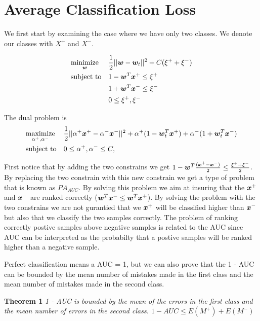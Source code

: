 \section{Average Classification Loss}

We first start by examining the case where we have only two classes. We denote our classes with $X^+$ and $X^-$.

\begin{equation*}
\begin{aligned}
& \underset{\bm{w}}{\text{minimize}}
& & \frac{1}{2} || \bm{w} - \bm{w}_t ||^2 + C ( \xi^+ + \xi^- ) \\
& \text{subject to}
& & 1 - \bm{w}^T \bm{x}^+ \leq \xi^+\\
& & & 1 + \bm{w}^T \bm{x}^-  \leq \xi^- \\
& & & 0 \leq \xi^+, \xi^-
\end{aligned}
\end{equation*}


The dual problem is 
\begin{equation*}
\begin{aligned}
& \underset{\alpha^+, \alpha^-}{\text{maximize}}
& & \frac{1}{2} || \alpha^+ \bm{x}^+ - \alpha^- \bm{x}^-||^2 + \alpha^+ (1 - \bm{w}_t^T \bm{x}^+ ) + \alpha^- (1 + \bm{w}_t^T \bm{x}^- )\\
& \text{subject to}
& & 0 \leq \alpha^+,\alpha^- \leq C, 
\end{aligned}
\end{equation*}


First notice that by adding the two constrains we get $1 - \bm{w}^T \frac{(\bm{x}^+ - \bm{x}^- )}{2} \leq \frac{\xi^+ + \xi^-}{2}$. By replacing the two constrain with this new constrain we get a type of problem that is known as $PA_{AUC}$. By solving this problem we aim at insuring that the $\bm{x}^+$ and $\bm{x}^-$ are ranked correctly ($ \bm{w}^T \bm{x}^- \leq \bm{w}^T \bm{x}^+ $).  By solving the problem with the two constrains we are not gurantied that we $\bm{x}^+$ will be classified higher than $\bm{x}^-$ but also that we classify the two samples correctly. The problem of ranking correctly postive samples above negative samples is related to the AUC since AUC can be interpreted as the probabilty that a postive samples will be ranked higher than a negative sample.

Perfect classification means a AUC = 1, but we can also prove that the 1 - AUC can be bounded by the mean number of mistakes made in the first class and the mean number of mistakes made in the second class.

{\bf Theorem 1} {\it 1 - AUC is bounded by the mean 
of the errors in the first class and the mean number of errors in the second
class.  $1 - AUC \leq E(M^+) + E(M^-)$ 
}

